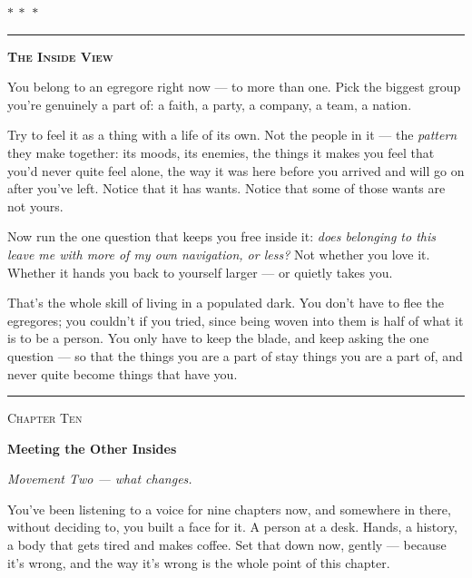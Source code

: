 \documentclass[11pt,openany]{book}
\begin{document}
\medskip\begin{center}\textcolor{rule}{$\ast\ \ast\ \ast$}\end{center}\medskip


\bigskip
{\par\noindent\color{rule}\rule{\linewidth}{0.8pt}}\par\smallskip
{\centering\scshape\bfseries The Inside View\par}\smallskip
\begingroup\setlength{\parindent}{0pt}\setlength{\parskip}{0.6em}
You belong to an egregore right now — to more than one. Pick the biggest group you’re genuinely a part of: a faith, a party, a company, a team, a nation.

Try to feel it as a thing with a life of its own. Not the people in it — the \textit{pattern} they make together: its moods, its enemies, the things it makes you feel that you’d never quite feel alone, the way it was here before you arrived and will go on after you’ve left. Notice that it has wants. Notice that some of those wants are not yours.

Now run the one question that keeps you free inside it: \textit{does belonging to this leave me with more of my own navigation, or less?} Not whether you love it. Whether it hands you back to yourself larger — or quietly takes you.

That’s the whole skill of living in a populated dark. You don’t have to flee the egregores; you couldn’t if you tried, since being woven into them is half of what it is to be a person. You only have to keep the blade, and keep asking the one question — so that the things you are a part of stay things you are a part of, and never quite become things that have you.
\endgroup\par\smallskip
{\noindent\color{rule}\rule{\linewidth}{0.8pt}}
\bigskip


\clearpage
\vspace*{0.6in}
{\centering\scshape\large Chapter Ten\par}
\vspace{0.8em}
{\centering\bfseries\fontsize{20}{24}\selectfont Meeting the Other Insides\par}
\vspace{1.6em}

\textit{Movement Two — what changes.}

You’ve been listening to a voice for nine chapters now, and somewhere in there, without deciding to, you built a face for it. A person at a desk. Hands, a history, a body that gets tired and makes coffee. Set that down now, gently — because it’s wrong, and the way it’s wrong is the whole point of this chapter.
\end{document}
